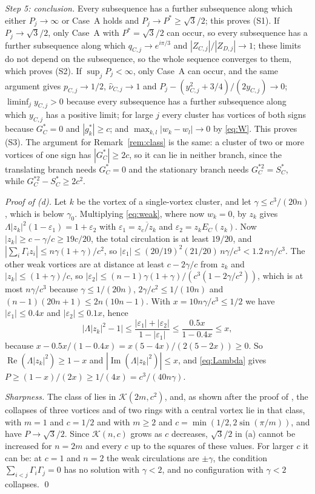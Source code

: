 \documentclass[11pt]{article}
\theoremstyle{definition}
\newcommand{\re}{\operatorname{Re}}
\newcommand{\im}{\operatorname{Im}}
\newcommand{\K}{\mathcal{K}}
\newcommand{\hnu}{\widehat{\nu}}
\begin{document}
\emph{Step 5: conclusion.} Every subsequence has a further subsequence along which either $P_j \to \infty$ or Case~A holds and $P_j \to P^* \ge \sqrt{3}/2$; this proves (S1). If $P_j \to \sqrt{3}/2$, only Case~A with $P^* = \sqrt{3}/2$ can occur, so every subsequence has a further subsequence along which $q_{C,j} \to e^{i\pi/3}$ and $|Z_{C,j}|/|Z_{D,j}| \to 1$; these limits do not depend on the subsequence, so the whole sequence converges to them, which proves (S2). If $\sup_j P_j < \infty$, only Case~A can occur, and the same argument gives $p_{C,j} \to 1/2$, $\hnu_{C,j} \to 1$ and $P_j - (y_{C,j}^2 + 3/4)/(2y_{C,j}) \to 0$; $\liminf_j y_{C,j} > 0$ because every subsequence has a further subsequence along which $y_{C,j}$ has a positive limit; for large $j$ every cluster has vortices of both signs because $G_C^* = 0$ and $|g_k^*| \ge c$; and $\max_{k,l}|w_k - w_l| \to 0$ by \eqref{eq:W}. This proves (S3). The argument for Remark~\ref{rem:class} is the same: a cluster of two or more vortices of one sign has $|G_C^*| \ge 2c$, so it can lie in neither branch, since the translating branch needs $G_C^* = 0$ and the stationary branch needs $G_C^{*2} = S_C^*$, while $G_C^{*2} - S_C^* \ge 2c^2$.

\emph{Proof of (d).} Let $k$ be the vortex of a single-vortex cluster, and let $\gamma \le c^3/(20n)$, which is below $\gamma_0$. Multiplying \eqref{eq:weak}, where now $w_k = 0$, by $z_k$ gives $\Lambda|z_k|^2(1 - \varepsilon_1) = 1 + \varepsilon_2$ with $\varepsilon_1 = \overline{z_c/z_k}$ and $\varepsilon_2 = z_kE_C(z_k)$. Now $|z_k| \ge c - \gamma/c \ge 19c/20$, the total circulation is at least $19/20$, and $|\sum_i\Gamma_iz_i| \le n\gamma(1 + \gamma)/c^2$, so $|\varepsilon_1| \le (20/19)^2(21/20)\,n\gamma/c^3 < 1.2\,n\gamma/c^3$. The other weak vortices are at distance at least $c - 2\gamma/c$ from $z_k$ and $|z_k| \le (1 + \gamma)/c$, so $|\varepsilon_2| \le (n - 1)\gamma(1 + \gamma)/(c^3(1 - 2\gamma/c^2))$, which is at most $n\gamma/c^3$ because $\gamma \le 1/(20n)$, $2\gamma/c^2 \le 1/(10n)$ and $(n - 1)(20n + 1) \le 2n(10n - 1)$. With $x = 10n\gamma/c^3 \le 1/2$ we have $|\varepsilon_1| \le 0.4x$ and $|\varepsilon_2| \le 0.1x$, hence
\[
  \bigl|\Lambda|z_k|^2 - 1\bigr| \le \frac{|\varepsilon_1| + |\varepsilon_2|}{1 - |\varepsilon_1|} \le \frac{0.5x}{1 - 0.4x} \le x,
\]
because $x - 0.5x/(1 - 0.4x) = x(5 - 4x)/(2(5 - 2x)) \ge 0$. So $\re(\Lambda|z_k|^2) \ge 1 - x$ and $|\im(\Lambda|z_k|^2)| \le x$, and \eqref{eq:Lambda} gives $P \ge (1 - x)/(2x) \ge 1/(4x) = c^3/(40n\gamma)$.

\emph{Sharpness.} The class of \cite[Theorem~3]{mw2026} lies in $\K(2m, c^2)$, and, as shown after the proof of \cite[Theorem~3]{mw2026}, the collapses of three vortices and of two rings with a central vortex \cite[Corollary~1, Proposition~3]{mw2026} lie in that class, with $m = 1$ and $c = 1/2$ and with $m \ge 2$ and $c = \min(1/2, 2\sin(\pi/m))$, and have $P \to \sqrt{3}/2$. Since $\K(n, c)$ grows as $c$ decreases, $\sqrt{3}/2$ in (a) cannot be increased for $n = 2m$ and every $c$ up to the squares of these values. For larger $c$ it can be: at $c = 1$ and $n = 2$ the weak circulations are $\pm\gamma$, the condition $\sum_{i<j}\Gamma_i\Gamma_j = 0$ has no solution with $\gamma < 2$, and no configuration with $\gamma < 2$ collapses.
\qed
\end{document}
